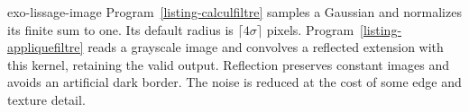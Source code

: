 \begin{correction}{exo-lissage-image}
Program~\ref{listing-calculfiltre} samples a Gaussian and normalizes its
finite sum to one. Its default radius is $\lceil4\sigma\rceil$ pixels.
Program~\ref{listing-appliquefiltre} reads a grayscale image and convolves
a reflected extension with this kernel, retaining the valid output.
Reflection preserves constant images and avoids an artificial dark border.
The noise is reduced at the cost of some edge and texture detail.
\begin{listing}[H]
\caption{A finite Gaussian kernel with unit sum.}
\label{listing-calculfiltre}
\end{listing}
\begin{listing}[H]
\caption{Gaussian image smoothing with reflected boundaries.}
\label{listing-appliquefiltre}
\end{listing}
\end{correction}

